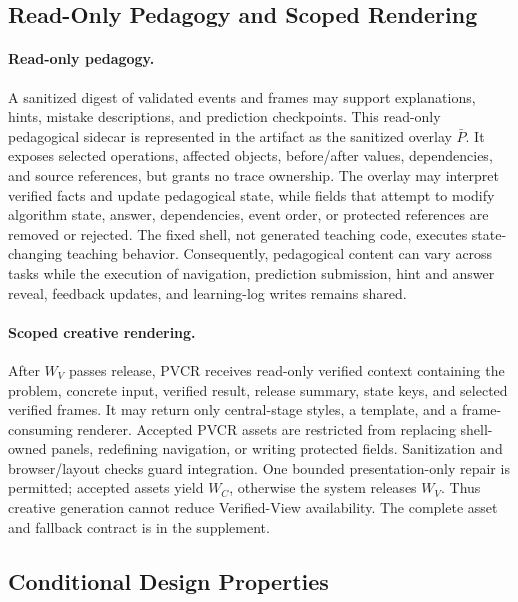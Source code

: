 \documentclass[letterpaper]{article}
\newcommand{\pvcr}{\textsc{PVCR}}
\begin{document}
\subsection{Read-Only Pedagogy and Scoped Rendering}
\label{sec:pedagogy_pvcr}

\paragraph{Read-only pedagogy.}
A sanitized digest of validated events and frames may support
explanations, hints, mistake descriptions, and prediction checkpoints.
This read-only pedagogical sidecar is represented in the artifact as
the sanitized overlay \(\bar P\).
It exposes selected operations, affected objects, before/after values,
dependencies, and source references, but grants no trace ownership. The
overlay may interpret verified facts and update pedagogical state, while
fields that attempt to modify algorithm state, answer, dependencies,
event order, or protected references are removed or rejected. The fixed
shell, not generated teaching code, executes state-changing teaching
behavior. Consequently, pedagogical content can vary across tasks while
the execution of navigation, prediction submission, hint and answer
reveal, feedback updates, and learning-log writes remains shared.

\paragraph{Scoped creative rendering.}
After \(W_V\) passes release, \pvcr{} receives read-only verified
context containing the problem, concrete input, verified result,
release summary, state keys, and selected verified frames. It may return
only central-stage styles, a template, and a frame-consuming renderer.
Accepted \pvcr{} assets are restricted from replacing shell-owned
panels, redefining navigation, or writing protected fields.
Sanitization and browser/layout checks guard
integration. One bounded presentation-only repair is permitted;
accepted assets yield \(W_C\), otherwise the system releases \(W_V\).
Thus creative generation cannot reduce Verified-View availability. The
complete asset and fallback contract is in the supplement.

\subsection{Conditional Design Properties}
\label{sec:design_properties}
\end{document}
